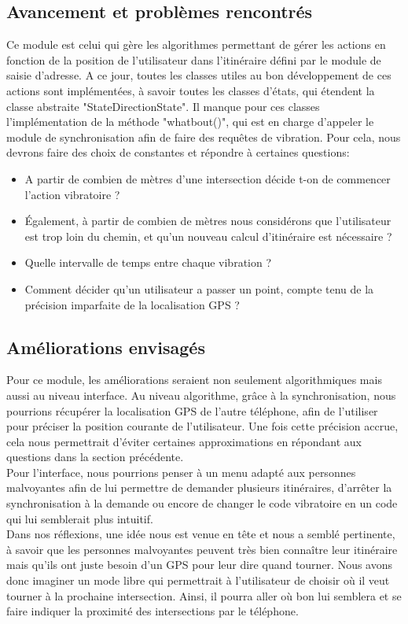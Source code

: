 \subsection{Avancement et problèmes rencontrés}
Ce module est celui qui gère les algorithmes permettant de gérer les actions en fonction de la position de l'utilisateur dans l'itinéraire défini par le module de saisie d'adresse. A ce jour, toutes les classes utiles au bon développement de ces actions sont implémentées, à savoir toutes les classes d'états, qui étendent la classe abstraite "StateDirectionState". Il manque pour ces classes l'implémentation de la méthode "whatbout()", qui est en charge d'appeler le module de synchronisation afin de faire des requêtes de vibration. Pour cela, nous devrons faire des choix de constantes et répondre à certaines questions:
\begin{itemize}
\item A partir de combien de mètres d'une intersection décide t-on de commencer l'action vibratoire ?
\item Également, à partir de combien de mètres nous considérons que l'utilisateur est trop loin du chemin, et qu'un nouveau calcul d'itinéraire est nécessaire ?
\item Quelle intervalle de temps entre chaque vibration ?
\item Comment décider qu'un utilisateur a passer un point, compte tenu de la précision imparfaite de la localisation GPS ?
\end{itemize}

\subsection{Améliorations envisagés}

Pour ce module, les améliorations seraient non seulement algorithmiques mais aussi au niveau interface. Au niveau algorithme, grâce à la synchronisation, nous pourrions récupérer la localisation GPS de l'autre téléphone, afin de l'utiliser pour préciser la position courante de l'utilisateur. Une fois cette précision accrue, cela nous permettrait d'éviter certaines approximations en répondant aux questions dans la section précédente.\\
Pour l'interface, nous pourrions penser à un menu adapté aux personnes malvoyantes afin de lui permettre de demander plusieurs itinéraires, d'arrêter la synchronisation à la demande ou encore de changer le code vibratoire en un code qui lui semblerait plus intuitif.\\
Dans nos réflexions, une idée nous est venue en tête et nous a semblé pertinente, à savoir que les personnes malvoyantes peuvent très bien connaître leur itinéraire mais qu'ils ont juste besoin d'un GPS pour leur dire quand tourner. Nous avons donc imaginer un mode libre qui permettrait à l'utilisateur de choisir où il veut tourner à la prochaine intersection. Ainsi, il pourra aller où bon lui semblera et se faire indiquer la proximité des intersections par le téléphone.

